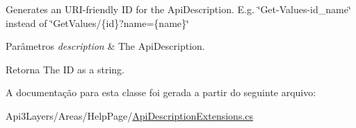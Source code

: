 Generates an U\+R\+I-\/friendly ID for the Api\+Description. E.\+g. \char`\"{}\+Get-\/\+Values-\/id\+\_\+name\char`\"{} instead of \char`\"{}\+Get\+Values/\{id\}?name=\{name\}\char`\"{} 


\begin{DoxyParams}{Parâmetros}
{\em description} & The Api\+Description.\\
\hline
\end{DoxyParams}
\begin{DoxyReturn}{Retorna}
The ID as a string.
\end{DoxyReturn}


A documentação para esta classe foi gerada a partir do seguinte arquivo\+:\begin{DoxyCompactItemize}
\item 
Api3\+Layers/\+Areas/\+Help\+Page/\hyperlink{ApiDescriptionExtensions_8cs}{Api\+Description\+Extensions.\+cs}\end{DoxyCompactItemize}
